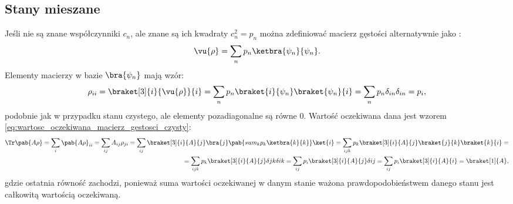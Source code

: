 \subsection{Stany mieszane}
Jeśli nie są znane współczynniki \(c_{n}\), ale znane są ich kwadraty \(c_{n}^{2} = p_{n}\) można zdefiniować macierz gęstości alternatywnie jako \cite{townsend_a_modern_approach_to_quantum_mechanics}:
\begin{equation}\label{eq:macierz_gestosci_mieszany}
	\vu{\rho} = \sum_{n} p_{n}\ketbra{\psi_{n}}{\psi_{n}}.
\end{equation}
Elementy macierzy w bazie \(\bra{\psi_{n}}\) mają wzór:
\begin{gather*}
	\rho_{ii} = \braket[3]{i}{\vu{\rho}}{i} = \sum_{n} p_{n}\braket{i}{\psi_{n}}\braket{\psi_{n}}{i} = \sum_{n} p_{n}\delta_{in}\delta_{in} = p_{i},
\end{gather*}
podobnie jak w przypadku stanu czystego, ale elementy pozadiagonalne są równe \(0\).
Wartość oczekiwana dana jest wzorem \eqref{eq:wartosc_oczekiwana_macierz_gestosci_czysty}:
\begin{equation}\label{eq:wartosc_oczekiwana_macierz_gestosci_mieszany}
\begin{split}
	\Tr\pab{A\rho} = 
	\sum_{i} \pab{A\rho}_{ii} = 
	\sum_{ij} A_{ij}\rho_{ji} = 
	\sum_{ij} \braket[3]{i}{A}{j}\bra{j}\pab{sum_{k} p_{k}\ketbra{k}{k}}\ket{i} = 
	\sum_{ijk} p_{k} \braket[3]{i}{A}{j} \braket{j}{k}\braket{k}{i} = \\ = 
	\sum_{ijk} p_{k} \braket[3]{i}{A}{j} \delta{jk}\delta{ik} = 
	\sum_{ij} p_{i} \braket[3]{i}{A}{j} \delta{ij} = 
	\sum_{ij} p_{i} \braket[3]{i}{A}{i} = 
	\braket[1]{A},
\end{split}
\end{equation}
gdzie ostatnia równość zachodzi, ponieważ suma wartości oczekiwanej w danym stanie ważona prawdopodobieństwem danego stanu jest całkowitą wartością oczekiwaną. 